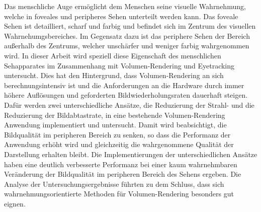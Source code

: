 Das menschliche Auge ermöglicht dem Menschen seine visuelle Wahrnehmung, welche in foveales und peripheres Sehen unterteilt werden kann.
Das foveale Sehen ist detailliert, scharf und farbig und befindet sich im Zentrum des visuellen Wahrnehumgsbereiches.
Im Gegensatz dazu ist das periphere Sehen der Bereich außerhalb des Zentrums, welcher unschärfer und weniger farbig wahrgenommen wird.
In dieser Arbeit wird speziell diese Eigenschaft des menschlichen Sehapparates im Zusammenhang mit Volumen-Rendering und Eyetracking untersucht.
Dies hat den Hintergrund, dass Volumen-Rendering an sich berechnungsintensiv ist und die Anforderungen an die Hardware durch immer höhere Auflösungen und geforderten Bildwiederholungsraten dauerhaft steigen.
Dafür werden zwei unterschiedliche Ansätze, die Reduzierung der Strahl- und die Reduzierung der Bildabtastrate, in eine bestehende Volumen-Rendering Anwendung implementiert und untersucht.
Damit wird beabsichtigt, die Bildqualität im peripheren Bereich zu senken, so dass die Performanz der Anwendung erhöht wird und gleichzeitig die wahrgenommene Qualität der Darstellung erhalten bleibt.
Die Implementierungen der unterschiedlichen Ansätze haben eine deutlich verbesserte Performanz bei einer kaum wahrnehmbaren Veränderung der Bildqualität im peripheren Bereich des Sehens ergeben.
Die Analyse der Untersuchungsergebnisse führten zu dem Schluss, dass sich wahrnehmungsorientierte Methoden für Volumen-Rendering besonders gut eignen.